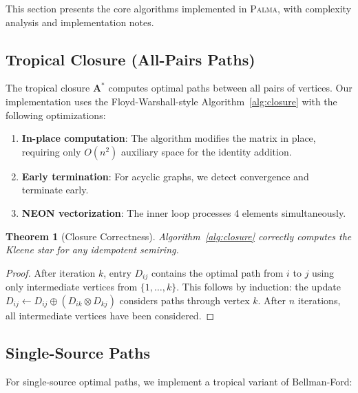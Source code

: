 \documentclass[11pt,a4paper]{article}
\theoremstyle{plain}
\newtheorem{theorem}{Theorem}[section]
\theoremstyle{definition}
\newcommand{\palma}{\textsc{Palma}}
\newcommand{\mat}[1]{\mathbf{#1}}
\begin{document}
This section presents the core algorithms implemented in \palma{}, with complexity analysis and implementation notes.

\subsection{Tropical Closure (All-Pairs Paths)}

The tropical closure $\mat{A}^*$ computes optimal paths between all pairs of vertices. Our implementation uses the Floyd-Warshall-style Algorithm~\ref{alg:closure} with the following optimizations:

\begin{enumerate}
    \item \textbf{In-place computation}: The algorithm modifies the matrix in place, requiring only $O(n^2)$ auxiliary space for the identity addition.
    
    \item \textbf{Early termination}: For acyclic graphs, we detect convergence and terminate early.
    
    \item \textbf{NEON vectorization}: The inner loop processes 4 elements simultaneously.
\end{enumerate}

\begin{theorem}[Closure Correctness]
Algorithm~\ref{alg:closure} correctly computes the Kleene star for any idempotent semiring.
\end{theorem}

\begin{proof}
After iteration $k$, entry $D_{ij}$ contains the optimal path from $i$ to $j$ using only intermediate vertices from $\{1, \ldots, k\}$. This follows by induction: the update $D_{ij} \leftarrow D_{ij} \oplus (D_{ik} \otimes D_{kj})$ considers paths through vertex $k$. After $n$ iterations, all intermediate vertices have been considered.
\end{proof}

\subsection{Single-Source Paths}

For single-source optimal paths, we implement a tropical variant of Bellman-Ford:
\end{document}

